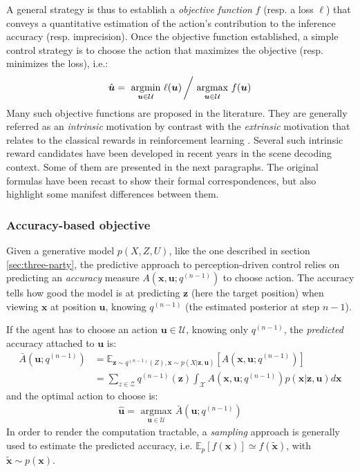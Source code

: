 \documentclass[12pt,twoside,openright]{article}
\begin{document}
A general strategy is thus to establish a \emph{objective function} $f$ (resp. a loss $\ell$) that conveys a quantitative estimation of the action's contribution to the inference accuracy (resp. imprecision). Once the objective function established, a simple control strategy is to choose the action that maximizes the objective (resp. minimizes the loss), i.e.:
\begin{align}
\hat{\boldsymbol{u}} = \underset{\boldsymbol{u}\in\mathcal{U}}{\text{ argmin }}  \ell(\boldsymbol{u})\left/ \underset{\boldsymbol{u}\in\mathcal{U}}{\text{ argmax }}  f(\boldsymbol{u})\right.
\end{align}
Many such objective functions are proposed in the literature. They are generally referred as an \emph{intrinsic} motivation \citep{oudeyer2008can} by contrast with the \emph{extrinsic} motivation that relates to the classical rewards in reinforcement learning \citep{sutton1998reinforcement}. {\color{Purple} Several such intrinsic reward candidates have been developed in recent years in the scene decoding context. Some of them are presented in the next paragraphs. The original formulas have been recast to show their formal correspondences, but also highlight some manifest differences between them.}

\subsubsection{Accuracy-based objective}\label{sec:infomax}


Given a generative model $p(X,Z,U)$, like the one described in section \ref{sec:three-party}, the predictive approach to perception-driven control \citep{najemnik2005optimal} relies on predicting an \emph{accuracy} measure $A(\boldsymbol{x}, \boldsymbol{u}; q^{(n-1)})$ to choose action. 
The accuracy tells how good the model is at predicting $\boldsymbol{z}$ (here the target position) when viewing $\boldsymbol{x}$ at position $\boldsymbol{u}$,
knowing $q^{(n-1)}$ (the estimated posterior at step $n-1$).

If the agent has to choose an action $\boldsymbol{u} \in \mathcal{U}$, knowing only $q^{(n-1)}$, the \emph{predicted} accuracy attached to $\boldsymbol{u}$ is:
\begin{align*}
\bar{A}(\boldsymbol{u}; q^{(n-1)})
&= \mathbb{E}_{\boldsymbol{z} \sim q^{(n-1)}(Z), \boldsymbol{x} \sim p(X|\boldsymbol{z}, \boldsymbol{u})}\left[A(\boldsymbol{x}, \boldsymbol{u}; q^{(n-1)})\right]  \\
&= \sum_{z\in\mathcal{Z}} q^{(n-1)}(\boldsymbol{z}) \int_{\mathcal{X}}  A(\boldsymbol{x}, \boldsymbol{u}; q^{(n-1)}) p(\boldsymbol{x}|\boldsymbol{z}, \boldsymbol{u}) d\boldsymbol{x}  
\end{align*}
and the optimal action to choose is:
\begin{align}
\hat{\boldsymbol{u}} = \underset{\boldsymbol{u} \in \mathcal{U}}{\text{ argmax }} \bar{A}(\boldsymbol{u}; q^{(n-1)})\label{eq:predictive-policy}
\end{align} 
In order to render the computation tractable, a \emph{sampling} approach is generally used to estimate the predicted accuracy, i.e. $\mathbb{E}_p[f(\boldsymbol{x})] \simeq f(\tilde{\boldsymbol{x}})$, with $\tilde{\boldsymbol{x}}\sim p(\boldsymbol{x})$.
\end{document}
